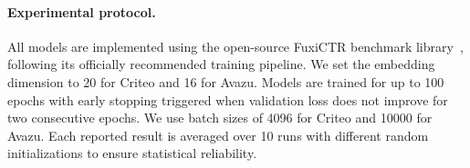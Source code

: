 \documentclass[sigconf,screen]{acmart}
\newcommand{\unimixer}{RankElastor }
\newcommand{\rankmixer}{RankMixer }
\begin{document}
\paragraph{Experimental protocol.} All models are implemented using the open-source FuxiCTR benchmark library~\cite{benchmark-fuxictr}, following its officially recommended training pipeline. 
We set the embedding dimension to 20 for Criteo and 16 for Avazu. 
Models are trained for up to 100 epochs with early stopping triggered when validation loss does not improve for two consecutive epochs. 
We use batch sizes of 4096 for Criteo and 10000 for Avazu. 
Each reported result is averaged over 10 runs with different random initializations to ensure statistical reliability.



\end{document}
